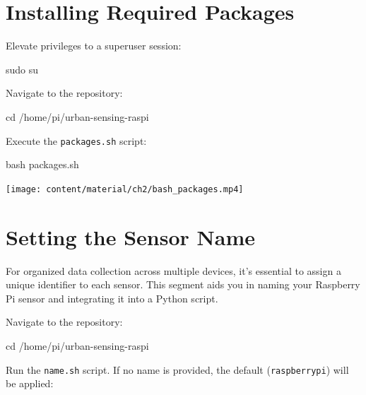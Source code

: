 \documentclass[
  letterpaper,
]{scrbook}
\newenvironment{Shaded}{\begin{snugshade}}{\end{snugshade}}
\newcommand{\BuiltInTok}[1]{\textcolor[rgb]{0.00,0.23,0.31}{#1}}
\newcommand{\FunctionTok}[1]{\textcolor[rgb]{0.28,0.35,0.67}{#1}}
\newcommand{\NormalTok}[1]{\textcolor[rgb]{0.00,0.23,0.31}{#1}}
\begin{document}
\section{Installing Required
Packages}\label{installing-required-packages}

Elevate privileges to a superuser session:

\begin{Shaded}
\begin{Highlighting}[]
\FunctionTok{sudo}\NormalTok{ su}
\end{Highlighting}
\end{Shaded}

Navigate to the repository:

\begin{Shaded}
\begin{Highlighting}[]
\BuiltInTok{cd}\NormalTok{ /home/pi/urban{-}sensing{-}raspi}
\end{Highlighting}
\end{Shaded}

Execute the \texttt{packages.sh} script:

\begin{Shaded}
\begin{Highlighting}[]
\FunctionTok{bash}\NormalTok{ packages.sh}
\end{Highlighting}
\end{Shaded}

\texttt{[image: content/material/ch2/bash\_packages.mp4]}

\section{Setting the Sensor Name}\label{setting-the-sensor-name}

For organized data collection across multiple devices, it's essential to
assign a unique identifier to each sensor. This segment aids you in
naming your Raspberry Pi sensor and integrating it into a Python script.

Navigate to the repository:

\begin{Shaded}
\begin{Highlighting}[]
\BuiltInTok{cd}\NormalTok{ /home/pi/urban{-}sensing{-}raspi}
\end{Highlighting}
\end{Shaded}

Run the \texttt{name.sh} script. If no name is provided, the default
(\texttt{raspberrypi}) will be applied:
\end{document}
